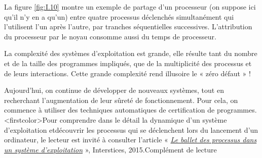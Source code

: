 
La figure \cref{fig:I.10} montre un exemple de partage d’un processeur (on suppose ici qu’il n’y en a qu’un) entre quatre processus déclenchés simultanément qui l’utilisent l’un après l’autre, par tranches séquentielles successives. L’attribution du processeur par le noyau consomme aussi du temps de processeur.


La complexité des systèmes d’exploitation est grande, elle résulte tant du nombre et de la taille des programmes impliqués, que de la multiplicité des processus et de leurs interactions. Cette grande complexité rend illusoire le « zéro défaut » ! 

Aujourd'hui, on continue de développer de nouveaux systèmes, tout en recherchant l’augmentation de leur sûreté de fonctionnement. Pour cela, on commence à utiliser des techniques automatiques de certification de programmes.\caution[c]<firstcolor>{Pour comprendre dans le détail la dynamique d’un système d’exploitation et\linebreak découvrir les processus qui se déclen\-chent lors du lancement d’un ordinateur, le lecteur est invité à consulter l’article « \href{https://interstices.info/le-ballet-des-processus-dans-un-systeme-dexploitation/}{\textit{Le ballet des processus dans un système d'exploitation}} », Interstices, 2015.}{Complément de lecture}

